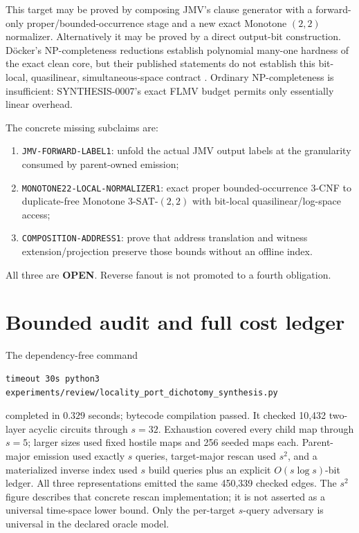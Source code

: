\documentclass[11pt]{article}
\newcommand{\OPEN}{\textbf{OPEN}}
\begin{document}
This target may be proved by composing JMV's clause generator with a
forward-only proper/bounded-occurrence stage and a new exact Monotone
$(2,2)$ normalizer.  Alternatively it may be proved by a direct output-bit
construction.  Döcker's NP-completeness reductions establish polynomial
many-one hardness of the exact clean core, but their published statements do
not establish this bit-local, quasilinear, simultaneous-space contract
\cite{doecker}.  Ordinary NP-completeness is insufficient: SYNTHESIS-0007's
exact FLMV budget permits only essentially linear overhead.

The concrete missing subclaims are:
\begin{enumerate}[nosep]
\item \texttt{JMV-FORWARD-LABEL1}: unfold the actual JMV output labels at the
granularity consumed by parent-owned emission;
\item \texttt{MONOTONE22-LOCAL-NORMALIZER1}: exact proper bounded-occurrence
3-CNF to duplicate-free Monotone 3-SAT-$(2,2)$ with bit-local
quasilinear/log-space access;
\item \texttt{COMPOSITION-ADDRESS1}: prove that address translation and
witness extension/projection preserve those bounds without an offline index.
\end{enumerate}
All three are \OPEN.  Reverse fanout is not promoted to a fourth obligation.

\section{Bounded audit and full cost ledger}

The dependency-free command
\begin{verbatim}
timeout 30s python3 experiments/review/locality_port_dichotomy_synthesis.py
\end{verbatim}
completed in $0.329$ seconds; bytecode compilation passed.  It checked
10,432 two-layer acyclic circuits through $s=32$.  Exhaustion covered every
child map through $s=5$; larger sizes used fixed hostile maps and 256 seeded
maps each.  Parent-major emission used exactly $s$ queries, target-major
rescan used $s^2$, and a materialized inverse index used $s$ build queries
plus an explicit $O(s\log s)$-bit ledger.  All three representations emitted
the same 450,339 checked edges.  The $s^2$ figure describes that concrete
rescan implementation; it is not asserted as a universal time-space lower
bound.  Only the per-target $s$-query adversary is universal in the declared
oracle model.
\end{document}
